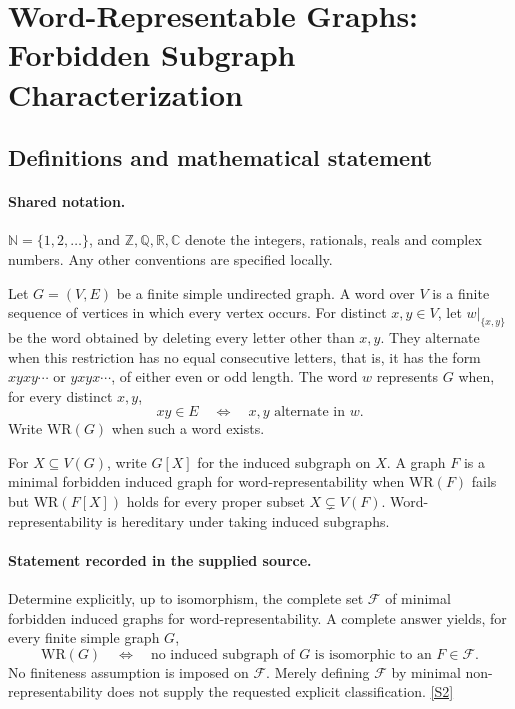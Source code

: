 \documentclass[11pt]{article}
\newcommand{\sref}[2]{\hyperlink{source:#1:#2}{[S#2]}}
\begin{document}
\section{Word-Representable Graphs: Forbidden Subgraph Characterization}\label{statement}

\subsection{Definitions and mathematical statement}

\paragraph{Shared notation.}$\mathbb N=\{1,2,\ldots\}$, and $\mathbb Z,\mathbb Q,\mathbb R,\mathbb C$ denote the integers, rationals, reals and complex numbers. Any other conventions are specified locally.


Let $G=(V,E)$ be a finite simple undirected graph. A word over $V$ is a finite sequence of vertices in which every vertex occurs. For distinct $x,y\in V$, let $w|_{\{x,y\}}$ be the word obtained by deleting every letter other than $x,y$. They alternate when this restriction has no equal consecutive letters, that is, it has the form $xyxy\cdots$ or $yxyx\cdots$, of either even or odd length. The word $w$ represents $G$ when, for every distinct $x,y$,
\[
 xy\in E\quad\Longleftrightarrow\quad x,y\text{ alternate in }w.
\]
Write $\mathrm{WR}(G)$ when such a word exists.

For $X\subseteq V(G)$, write $G[X]$ for the induced subgraph on $X$. A graph $F$ is a minimal forbidden induced graph for word-representability when $\mathrm{WR}(F)$ fails but $\mathrm{WR}(F[X])$ holds for every proper subset $X\subsetneq V(F)$. Word-representability is hereditary under taking induced subgraphs.
\paragraph{Statement recorded in the supplied source.}
Determine explicitly, up to isomorphism, the complete set $\mathcal F$ of minimal forbidden induced graphs for word-representability. A complete answer yields, for every finite simple graph $G$,
\[
 \mathrm{WR}(G)\quad\Longleftrightarrow\quad
 \text{no induced subgraph of }G\text{ is isomorphic to an }F\in\mathcal F.
\]
No finiteness assumption is imposed on $\mathcal F$. Merely defining $\mathcal F$ by minimal non-representability does not supply the requested explicit classification. \sref{statement}{2}
\end{document}
